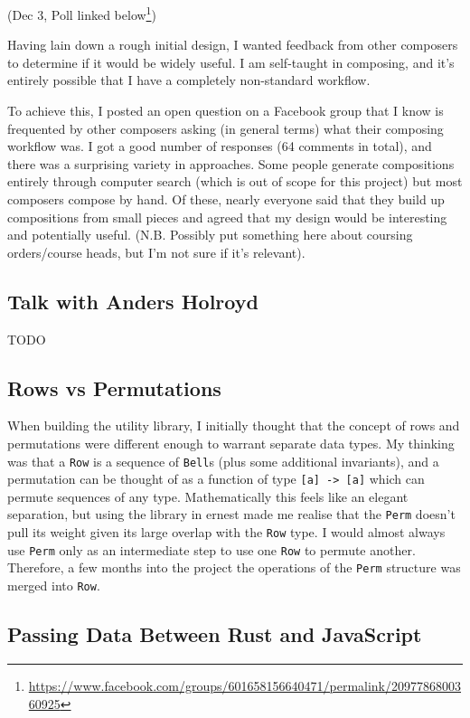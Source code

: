 \documentclass[12pt]{article}
\newcommand{\footurl}[1]{\footnote{\url{#1}}}
\begin{document}
(Dec 3, Poll linked
below\footurl{https://www.facebook.com/groups/601658156640471/permalink/2097786800360925})

Having lain down a rough initial design, I wanted feedback from other composers to determine if it
would be widely useful.  I am self-taught in composing, and it's entirely possible that I have a
completely non-standard workflow.

To achieve this, I posted an open question on a Facebook group that I know is frequented by other
composers asking (in general terms) what their composing workflow was.  I got a good number of
responses (64 comments in total), and there was a surprising variety in approaches.  Some people
generate compositions entirely through computer search (which is out of scope for this project) but
most composers compose by hand.  Of these, nearly everyone said that they build up compositions from
small pieces and agreed that my design would be interesting and potentially useful.  (N.B. Possibly
put something here about coursing orders/course heads, but I'm not sure if it's relevant).

\subsection{Talk with Anders Holroyd}

TODO

\subsection{Rows vs Permutations}

When building the utility library, I initially thought that the concept of rows and permutations
were different enough to warrant separate data types.  My thinking was that a \verb|Row| is a
sequence of \verb|Bell|s (plus some additional invariants), and a permutation can be thought of as a
function of type \verb|[a] -> [a]| which can permute sequences of any type.  Mathematically this
feels like an elegant separation, but using the library in ernest made me realise that the
\verb|Perm| doesn't pull its weight given its large overlap with the \verb|Row| type.  I would
almost always use \verb|Perm| only as an intermediate step to use one \verb|Row| to permute another.
Therefore, a few months into the project the operations of the \verb|Perm| structure was merged into
\verb|Row|.

\subsection{Passing Data Between Rust and JavaScript}
\end{document}
